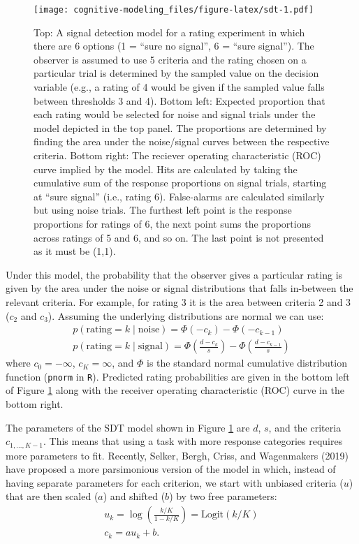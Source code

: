 \documentclass[
  english,
  ,man,floatsintext]{apa6}
\begin{document}
\begin{figure}
\centering
\texttt{[image: cognitive-modeling\_files/figure-latex/sdt-1.pdf]}
\caption{\label{fig:sdt}Top: A signal detection model for a rating experiment in which there are 6 options (1 = \enquote{sure no signal}, 6 = \enquote{sure signal}). The observer is assumed to use 5 criteria and the rating chosen on a particular trial is determined by the sampled value on the decision variable (e.g., a rating of 4 would be given if the sampled value falls between thresholds 3 and 4). Bottom left: Expected proportion that each rating would be selected for noise and signal trials under the model depicted in the top panel. The proportions are determined by finding the area under the noise/signal curves between the respective criteria. Bottom right: The reciever operating characteristic (ROC) curve implied by the model. Hits are calculated by taking the cumulative sum of the response proportions on signal trials, starting at \enquote{sure signal} (i.e., rating 6). False-alarms are calculated similarly but using noise trials. The furthest left point is the response proportions for ratings of 6, the next point sums the proportions across ratings of 5 and 6, and so on. The last point is not presented as it must be (1,1).}
\end{figure}

Under this model, the probability that the observer gives a particular rating is given by the area under the noise or signal distributions that falls in-between the relevant criteria. For example, for rating 3 it is the area between criteria 2 and 3 (\(c_2\) and \(c_3\)). Assuming the underlying distributions are normal we can use:
\[
\begin{aligned}
p(\mbox{rating} = k \mid \mbox{noise}) = \Phi(-c_{k}) - \Phi(-c_{k - 1}) \\
p(\mbox{rating} = k \mid \mbox{signal}) = \Phi{\left( \frac{d - c_{k}}{s} \right)} - \Phi{\left( \frac{d -c_{k - 1}}{s} \right)}
\end{aligned}
\]
where \(c_0 = -\infty\), \(c_K = \infty\), and \(\Phi\) is the standard normal cumulative distribution function (\texttt{pnorm} in \texttt{R}). Predicted rating probabilities are given in the bottom left of Figure \ref{fig:sdt} along with the receiver operating characteristic (ROC) curve in the bottom right.

The parameters of the SDT model shown in Figure \ref{fig:sdt} are \(d\), \(s\), and the criteria \(c_{1,...,K-1}\). This means that using a task with more response categories requires more parameters to fit. Recently, Selker, Bergh, Criss, and Wagenmakers (2019) have proposed a more parsimonious version of the model in which, instead of having separate parameters for each criterion, we start with unbiased criteria (\(u\)) that are then scaled (\(a\)) and shifted (\(b\)) by two free parameters:
\[
\begin{aligned}
u_k = \log\left( \frac{k/K}{1 - k/K} \right) = \mbox{Logit}(k/K) \\
c_k = au_k + b.
\end{aligned}
\]
\end{document}
